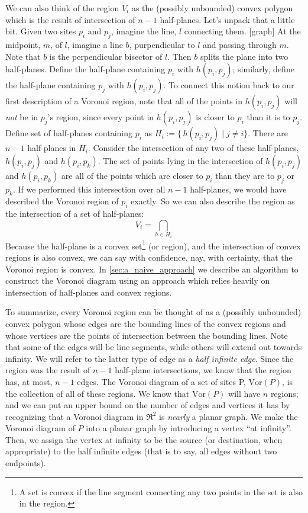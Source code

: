 \documentclass[12pt,twoside]{reedthesis}
\begin{document}
    We can also think of the region $V_{i}$ as the (possibly unbounded) convex polygon which is the result of intersection of $n-1$ half-planes. Let's unpack that a little bit. Given two sites $p_{i}$ and $p_{j}$, imagine the line, $l$ connecting them. [graph] At the midpoint, $m$, of $l$, imagine a line $b$, purpendicular to $l$ and passing through $m$. Note that $b$ is the perpendicular bisector of $l$. Then $b$ splits the plane into two half-planes. Define the half-plane containing $p_{i}$ with $h(p_{i}, p_{j})$; similarly, define the half-plane containing $p_{j}$ with $h(p_{i}, p_{j})$. To connect this notion back to our first description of a Voronoi region, note that all of the points in $h(p_{i}, p_{j})$ will \emph{not} be in $p_{j}$'s region, since every point in $h(p_{i}, p_{j})$ is closer to $p_{i}$ than it is to $p_{j}$. Define set of half-planes containing $p_{i}$ as $H_{i} := \{\,h(p_{i}, p_{j}) \mid j\neq i \}$. There are $n-1$ half-planes in $H_{i}$. Consider the intersection of any two of these half-planes, $h(p_{i}, p_{j})$ and $h(p_{i}, p_{k})$. The set of points lying in the intersection of $h(p_{i}, p_{j})$ and $h(p_{i}, p_{k})$ are all of the points which are closer to $p_{i}$ than they are to $p_{j}$ or $p_{k}$. If we performed this intersection over all $n-1$ half-planes, we would have described the Voronoi region of $p_{i}$ exactly. So we can also describe the region as the intersection of a set of half-planes:
    $$V_{i} = \bigcap_{h \in H_{i}}$$ 
    Because the half-plane is a convex set\footnote{A set is convex if the line segment connecting any two points in the set is also in the region.} (or region), and the intersection of convex regions is also convex, we can say with confidence, nay, with certainty, that the Voronoi region is convex. In \cref{sec:a_naive_approach} we describe an algorithm to construct the Voronoi diagram using an approach which relies heavily on intersection of half-planes and convex regions.\par
    To summarize, every Voronoi region can be thought of as a (possibly unbounded) convex polygon whose edges are the bounding lines of the convex regions and whose vertices are the points of intersection between the bounding lines. Note that some of the edges will be line segments, while others will extend out towards infinity. We will refer to the latter type of edge as a \emph{half infinite edge}. Since the region was the result of $n-1$ half-plane intersections, we know that the region has, at most, $n-1$ edges. The Voronoi diagram of a set of sites P, $\mbox{Vor}(P)$, is the collection of all of these regions.
    We know that $\mbox{Vor}(P)$ will have $n$ regions; and we can put an upper bound on the number of edges and vertices it has by recognizing that a Voronoi diagram in $\Re^2$ is \emph{nearly} a planar graph. We make the Voronoi diagram of $P$ into a planar graph by introducing a vertex ``at infinity''. Then, we assign the vertex at infinity to be the source (or destination, when appropriate) to the half infinite edges (that is to say, all edges without two endpoints).\par
\end{document}
